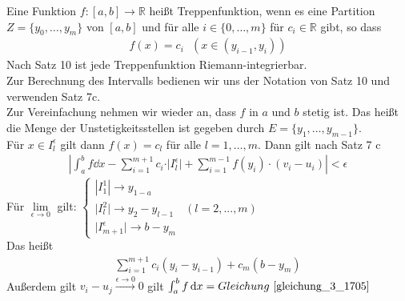 \begin{Definition}{
	Eine Funktion $f: [a,b] \rightarrow \mathbb{R}$ heißt Treppenfunktion, wenn es 
	eine Partition $Z = \{ y_0, \hdots, y_m \}$ von $[a,b]$ und für alle 
	$i \in \{0, \hdots, m\}$ für $c_i \in \mathbb{R}$ gibt, so dass 
	\begin{align*}
		f(x) = c_i \text{ } ( x\in (y_{i-1},y_i))
	\end{align*}
	Nach Satz 10 %
	ist jede Treppenfunktion Riemann-integrierbar. \\
	Zur Berechnung des Intervalls bedienen wir uns der Notation von Satz 10 
	und verwenden Satz 7c.\\
	Zur Vereinfachung nehmen wir wieder an, dass $f$ in $a$ und $b$ stetig ist. 
	Das heißt die Menge der Unstetigkeitsstellen ist gegeben durch 
	$E = \{y_1, \hdots, y_{m-1}\}$. \\
	Für $x \in I_l^{\epsilon}$ gilt dann $f(x) = c_l$ für alle $ l = 1, \hdots, m$.
	Dann gilt nach Satz 7 c %
	\begin{align*}
		\left\vert \int_a^b f \dd{x} - \sum_{i=1}^{m+1} c_i \cdot \vert 
		I_l^{\epsilon}\vert + \sum_{i =1}^{m-1} f(y_i)\cdot (v_i -u_i) \right\vert
		< \epsilon
	\end{align*}
	Für $ \lim\limits_{\epsilon \rightarrow 0}{}$ gilt:
	$\begin{cases} 
		|I_1^1| \rightarrow y_{1-a} & \\
		\vert I_l^2 \vert \rightarrow y_2 - y_{l-1} & ( l = 2,...,m) \\
		\vert I_{m+1}^{\epsilon} \vert \rightarrow b - y_m &
	\end{cases}$ \\
	Das heißt
	\begin{align}
		\label{gleichung_3_1705}
		\sum_{i=1}^{m+1}c_i(y_i -y_{i-1}) + c_m(b-y_m)
	\end{align}
	Außerdem gilt $v_i-u_j \overset{\epsilon \rightarrow 0}{\rightarrow} 0$
	gilt $\int_a^b f\dd{x} = Gleichung~\ref{gleichung_3_1705}$
	
}\end{Definition}
